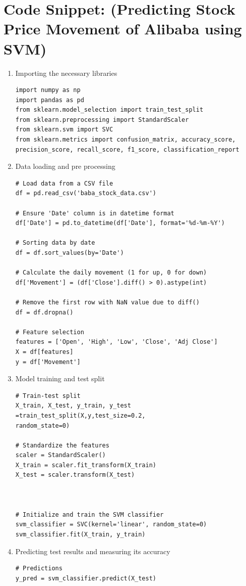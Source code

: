 \documentclass[12pt,a4paper]{report}
\begin{document}
\section{Code Snippet: (Predicting Stock Price Movement of Alibaba using SVM)}
\begin{enumerate}
        \item Importing the necessary libraries
        \begin{verbatim}
import numpy as np
import pandas as pd
from sklearn.model_selection import train_test_split
from sklearn.preprocessing import StandardScaler
from sklearn.svm import SVC
from sklearn.metrics import confusion_matrix, accuracy_score, 
precision_score, recall_score, f1_score, classification_report
       \end{verbatim}
       \item Data loading and pre processing 
       \begin{verbatim}
# Load data from a CSV file
df = pd.read_csv('baba_stock_data.csv')

# Ensure 'Date' column is in datetime format
df['Date'] = pd.to_datetime(df['Date'], format='%d-%m-%Y')

# Sorting data by date
df = df.sort_values(by='Date')

# Calculate the daily movement (1 for up, 0 for down)
df['Movement'] = (df['Close'].diff() > 0).astype(int)

# Remove the first row with NaN value due to diff()
df = df.dropna()

# Feature selection
features = ['Open', 'High', 'Low', 'Close', 'Adj Close']
X = df[features]
y = df['Movement']
     \end{verbatim}
   
     \item Model training and test split 
     \begin{verbatim}
# Train-test split
X_train, X_test, y_train, y_test =train_test_split(X,y,test_size=0.2,
random_state=0) 

# Standardize the features
scaler = StandardScaler()
X_train = scaler.fit_transform(X_train)
X_test = scaler.transform(X_test)



# Initialize and train the SVM classifier
svm_classifier = SVC(kernel='linear', random_state=0)
svm_classifier.fit(X_train, y_train)
    \end{verbatim}
    \item Predicting test results and measuring its accuracy
    \begin{verbatim}
# Predictions
y_pred = svm_classifier.predict(X_test)


\end{verbatim}
\end{enumerate}
\end{document}
